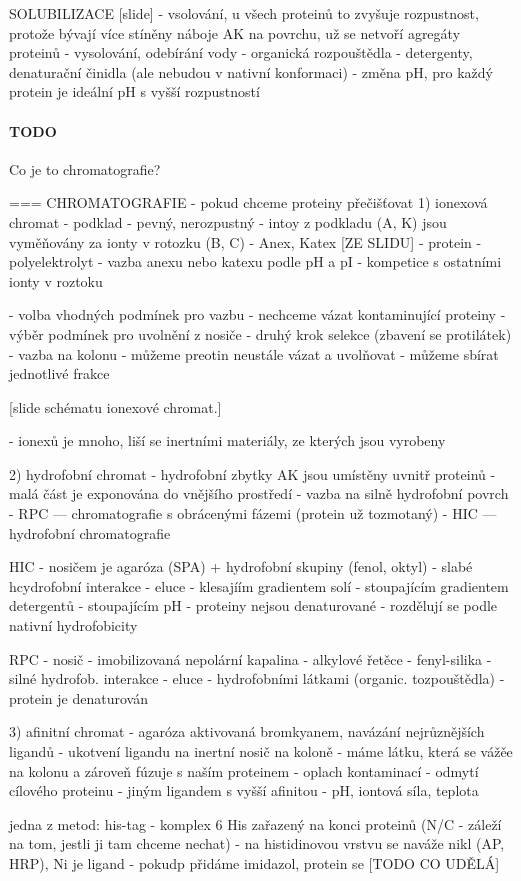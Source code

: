 \documentclass[DIV=8]{scrreprt}
\newcommand{\mybox}[2]{
    \paragraph{#1} #2
}
\begin{document}
SOLUBILIZACE [slide]
- vsolování, u všech proteinů to zvyšuje rozpustnost, protože bývají více stíněny náboje AK na povrchu, už se netvoří agregáty proteinů
- vysolování, odebírání vody
- organická rozpouštědla
- detergenty, denaturační činidla (ale nebudou v nativní konformaci)
- změna pH, pro každý protein je ideální pH s vyšší rozpustností

\mybox{TODO}{Co je to chromatografie?}


=== CHROMATOGRAFIE
- pokud chceme proteiny přečišťovat
1) ionexová chromat
- podklad
    - pevný, nerozpustný
    - intoy z podkladu (A, K) jsou vyměňovány za ionty v rotozku (B, C)
    - Anex, Katex [ZE SLIDU]
- protein
    - polyelektrolyt
    - vazba anexu nebo katexu podle pH a pI
    - kompetice s ostatními ionty v roztoku

- volba vhodných podmínek pro vazbu
    - nechceme vázat kontaminující proteiny
- výběr podmínek pro uvolnění z nosiče
    - druhý krok selekce (zbavení se protilátek)
- vazba na kolonu
    - můžeme preotin neustále vázat a uvolňovat
    - můžeme sbírat jednotlivé frakce

[slide schématu ionexové chromat.]

- ionexů je mnoho, liší se inertními materiály, ze kterých jsou vyrobeny

2) hydrofobní chromat
- hydrofobní zbytky AK jsou umístěny uvnitř proteinů
- malá část je exponována do vnějšího prostředí
- vazba na silně hydrofobní povrch
    - RPC --- chromatografie s obrácenými fázemi (protein už tozmotaný)
    - HIC --- hydrofobní chromatografie

HIC
- nosičem je agaróza (SPA) + hydrofobní skupiny (fenol, oktyl)
- slabé hcydrofobní interakce
- eluce
    - klesajíím gradientem solí
    - stoupajícím gradientem detergentů
    - stoupajícím pH
- proteiny nejsou denaturované
- rozdělují se podle nativní hydrofobicity

RPC
- nosič
    - imobilizovaná nepolární kapalina
    - alkylové řetěce
    - fenyl-silika
- silné hydrofob. interakce
- eluce
    - hydrofobními látkami (organic. tozpouštědla)
- protein je denaturován

3) afinitní chromat
- agaróza aktivovaná bromkyanem, navázání nejrůznějších ligandů
- ukotvení ligandu na inertní nosič na koloně
    - máme látku, která se vážěe na kolonu a zároveň fúzuje s naším proteinem
- oplach kontaminací
- odmytí cílového proteinu
    - jiným ligandem s vyšší afinitou
    - pH, iontová síla, teplota

jedna z metod: his-tag
- komplex 6 His zařazený na konci proteinů (N/C - záleží na tom, jestli ji tam chceme nechat)
    - na histidinovou vrstvu se naváže nikl (AP, HRP), Ni je ligand
- pokudp přidáme imidazol, protein se [TODO CO UDĚLÁ]
\end{document}

